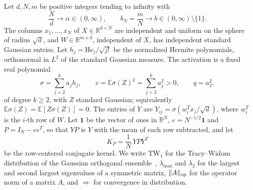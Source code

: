 \documentclass[11pt]{amsart}
\theoremstyle{remark}
\numberwithin{equation}{section}
\newcommand{\EE}{\mathbb{E}}
\newcommand{\RR}{\mathbb{R}}
\newcommand{\TW}{\mathrm{TW}_1}
\begin{document}
Let $d,N,m$ be positive integers tending to infinity with
\begin{equation}\label{eq:ratios}
\frac Nd\to\alpha\in(0,\infty),\qquad b_N=\frac mN\to b\in(0,\infty)\setminus\{1\}.
\end{equation}
The columns $x_1,\dots,x_N$ of $X\in\RR^{d\times N}$ are independent and uniform on the sphere of radius $\sqrt d$, and $W\in\RR^{m\times d}$, independent of $X$, has independent standard Gaussian entries. Let $h_j=\mathrm{He}_j/\sqrt{j!}$ be the normalized Hermite polynomials, orthonormal in $L^2$ of the standard Gaussian measure. The activation is a fixed real polynomial
\begin{equation}\label{eq:sigma}
\sigma=\sum_{j=2}^{k}a_jh_j,\qquad v=\EE\sigma(Z)^2=\sum_{j=2}^{k}a_j^2>0,\qquad q=a_2^2,
\end{equation}
of degree $k\ge2$, with $Z$ standard Gaussian; equivalently $\EE\sigma(Z)=\EE[Z\sigma(Z)]=0$. The entries of $Y$ are $Y_{ij}=\sigma(w_i^{T}x_j/\sqrt d)$, where $w_i^{T}$ is the $i$-th row of $W$. Let $\mathbf 1$ be the vector of ones in $\RR^{N}$, $e=N^{-1/2}\mathbf 1$ and $P=I_N-ee^{T}$, so that $YP$ is $Y$ with the mean of each row subtracted, and let
\[
K_P=\frac1N\,YPY^{T}
\]
be the row-centered conjugate kernel.
We write $\TW$ for the Tracy--Widom distribution of the Gaussian orthogonal ensemble~\cite{TW}, $\lambda_{\max}$ and $\lambda_2$ for the largest and second largest eigenvalues of a symmetric matrix, $\|A\|_{\rm op}$ for the operator norm of a matrix $A$, and $\Longrightarrow$ for convergence in distribution.
\end{document}
